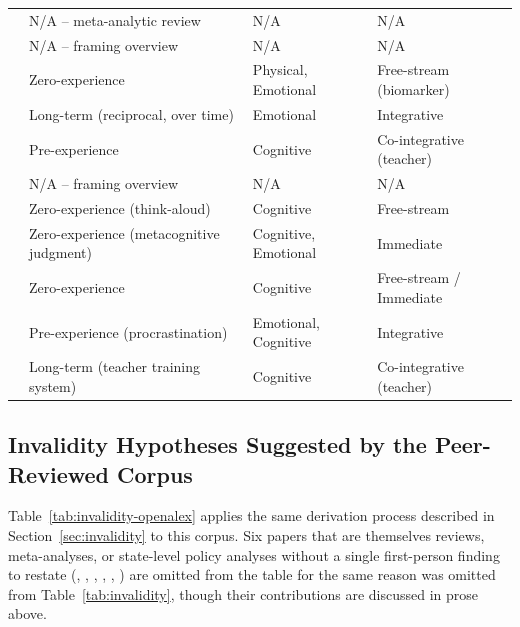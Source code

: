 \documentclass[11pt]{article}
\begin{document}
{\begin{longtable}{p{2.6cm} p{4.3cm} p{4.3cm} p{3.3cm}}
\citet{vonderembse2017metaanalysis} & N/A -- meta-analytic review & N/A & N/A \\
\citet{stobart2012value} & N/A -- framing overview & N/A & N/A \\
\citet{heissel2019physio} & Zero-experience & Physical, Emotional & Free-stream (biomarker) \\
\citet{steinmayr2016wellbeing} & Long-term (reciprocal, over time) & Emotional & Integrative \\
\citet{gulek2003preparing} & Pre-experience & Cognitive & Co-integrative (teacher) \\
\citet{sloane2003issues} & N/A -- framing overview & N/A & N/A \\
\citet{brizuela2016autorreportes} & Zero-experience (think-aloud) & Cognitive & Free-stream \\
\citet{chacon2025simulacion} & Zero-experience (metacognitive judgment) & Cognitive, Emotional & Immediate \\
\citet{jimenez2018validacion} & Zero-experience & Cognitive & Free-stream / Immediate \\
\citet{manchado2021procrastinacion} & Pre-experience (procrastination) & Emotional, Cognitive & Integrative \\
\citet{carrasco2019formacion} & Long-term (teacher training system) & Cognitive & Co-integrative (teacher) \\
\end{longtable}
}

\subsection{Invalidity Hypotheses Suggested by the Peer-Reviewed Corpus}
\label{sec:invalidity-openalex}

Table~\ref{tab:invalidity-openalex} applies the same derivation process described in Section~\ref{sec:invalidity} to this corpus. Six papers that are themselves reviews, meta-analyses, or state-level policy analyses without a single first-person finding to restate (\citeauthor{amrein2002learning}, \citeauthor{polesel2012experience}, \citeauthor{nichols2006accountability}, \citeauthor{vonderembse2017metaanalysis}, \citeauthor{stobart2012value}, \citeauthor{sloane2003issues}) are omitted from the table for the same reason \citet{kaleta2025studentperspectives} was omitted from Table~\ref{tab:invalidity}, though their contributions are discussed in prose above.
\end{document}
